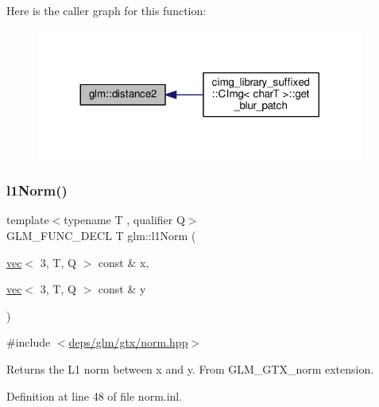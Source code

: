 Here is the caller graph for this function\+:
\nopagebreak
\begin{figure}[H]
\begin{center}
\leavevmode
\includegraphics[width=305pt]{db/db7/group__gtx__norm_ga85660f1b79f66c09c7b5a6f80e68c89f_icgraph}
\end{center}
\end{figure}
\mbox{\label{group__gtx__norm_gae2fc0b2aa967bebfd6a244700bff6997}} 
\subsubsection{\texorpdfstring{l1\+Norm()}{l1Norm()}\hspace{0.1cm}{\footnotesize\ttfamily [1/2]}}
{\footnotesize\ttfamily template$<$typename T , qualifier Q$>$ \\
G\+L\+M\+\_\+\+F\+U\+N\+C\+\_\+\+D\+E\+CL T glm\+::l1\+Norm (\begin{DoxyParamCaption}\item[{\hyperlink{structglm_1_1vec}{vec}$<$ 3, T, Q $>$ const \&}]{x,  }\item[{\hyperlink{structglm_1_1vec}{vec}$<$ 3, T, Q $>$ const \&}]{y }\end{DoxyParamCaption})}



{\ttfamily \#include $<$\hyperlink{norm_8hpp}{deps/glm/gtx/norm.\+hpp}$>$}

Returns the L1 norm between x and y. From G\+L\+M\+\_\+\+G\+T\+X\+\_\+norm extension. 

Definition at line 48 of file norm.\+inl.

\mbox{\label{group__gtx__norm_ga1a7491e2037ceeb37f83ce41addfc0be}} 
